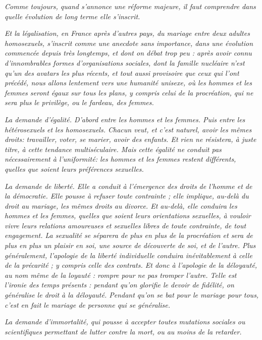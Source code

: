 \begin{displayquote}
\emph{Comme toujours, quand s'annonce une réforme majeure, il faut comprendre dans quelle évolution de long terme elle s'inscrit.}
 
\emph{Et la légalisation, en France après d'autres pays, du mariage entre deux adultes homosexuels, s'inscrit comme une anecdote sans importance, dans une évolution commencée depuis très longtemps, et dont on débat trop peu : après avoir connu d'innombrables formes d'organisations sociales, dont la famille nucléaire n'est qu'un des avatars les plus récents, et tout aussi provisoire que ceux qui l'ont précédé, nous allons lentement vers une humanité unisexe, où les hommes et les femmes seront égaux sur tous les plans, y compris celui de la procréation, qui ne sera plus le privilège, ou le fardeau, des femmes.} 
 
\emph{\primo La demande d'égalité. D'abord entre les hommes et les femmes. Puis entre les hétérosexuels et les homosexuels. Chacun veut, et c'est naturel, avoir les mêmes droits: travailler, voter, se marier, avoir des enfants. Et rien ne résistera, à juste titre, à cette tendance multiséculaire. Mais cette égalité ne conduit pas nécessairement à l'uniformité: les hommes et les femmes restent différents, quelles que soient leurs préférences sexuelles.}
 
\emph{\secundo La demande de liberté. Elle a conduit à l'émergence des droits de l'homme et de la démocratie. Elle pousse à refuser toute contrainte ; elle implique, au-delà du droit au mariage, les mêmes droits au divorce. Et au-delà, elle conduira les hommes et les femmes, quelles que soient leurs orientations sexuelles, à vouloir vivre leurs relations amoureuses et sexuelles libres de toute contrainte, de tout engagement. La sexualité se séparera de plus en plus de la procréation et sera de plus en plus un plaisir en soi, une source de découverte de soi, et de l'autre. Plus généralement, l'apologie de la liberté individuelle conduira inévitablement à celle de la précarité ; y compris celle des contrats. Et donc à l'apologie de la déloyauté, au nom même de la loyauté : rompre pour ne pas tromper l'autre. Telle est l'ironie des temps présents : pendant qu'on glorifie le devoir de fidélité, on généralise le droit à la déloyauté. Pendant qu'on se bat pour le mariage pour tous, c'est en fait le mariage de personne qui se généralise.}
 
\emph{\tertio La demande d'immortalité, qui pousse à accepter toutes mutations sociales ou scientifiques permettant de lutter contre la mort, ou au moins de la retarder.}
 

\end{displayquote}
